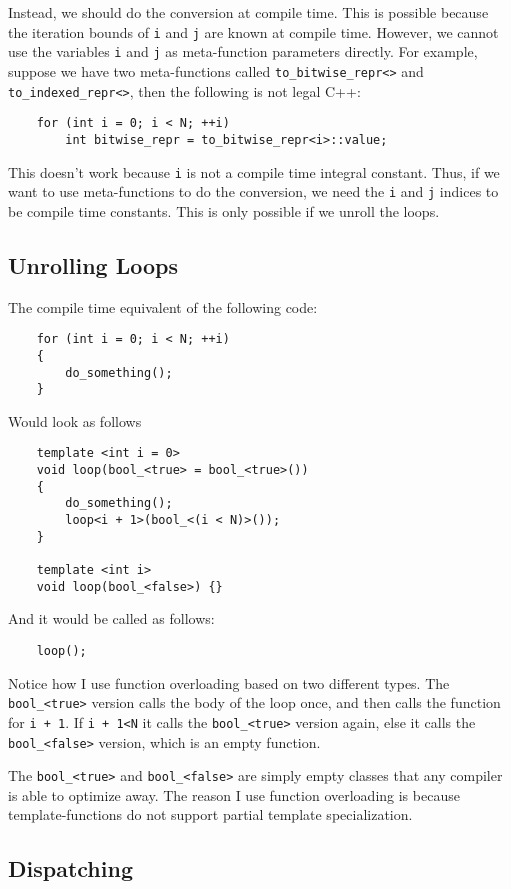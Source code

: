 \documentclass[10pt]{article}
\begin{document}
Instead, we should do the conversion at compile time. This is
possible because the iteration bounds of \verb"i" and \verb"j" are
known at compile time. However, we cannot use the variables
\verb"i" and \verb"j" as meta-function parameters directly. For
example, suppose we have two meta-functions called
\verb"to_bitwise_repr<>" and \verb"to_indexed_repr<>", then the
following is not legal C++:
\begin{verbatim}
    for (int i = 0; i < N; ++i)
        int bitwise_repr = to_bitwise_repr<i>::value;
\end{verbatim}
This doesn't work because \verb"i" is not a compile time integral
constant. Thus, if we want to use meta-functions to do the
conversion, we need the \verb"i" and \verb"j" indices to be
compile time constants. This is only possible if we unroll the
loops.

\subsection{Unrolling Loops}

The compile time equivalent of the following code:
\begin{verbatim}
    for (int i = 0; i < N; ++i)
    {
        do_something();
    }
\end{verbatim}
Would look as follows
\begin{verbatim}
    template <int i = 0>
    void loop(bool_<true> = bool_<true>())
    {
        do_something();
        loop<i + 1>(bool_<(i < N)>());
    }

    template <int i>
    void loop(bool_<false>) {}
\end{verbatim}
And it would be called as follows:
\begin{verbatim}
    loop();
\end{verbatim}
Notice how I use function overloading based on two different
types. The \verb"bool_<true>" version calls the body of the loop
once, and then calls the function for \verb"i + 1". If \verb"i + 1<N" it calls the \verb"bool_<true>" version again, else it
calls the \verb"bool_<false>" version, which is an empty
function.

The \verb"bool_<true>" and \verb"bool_<false>" are simply
empty classes that any compiler is able to optimize away. The
reason I use function overloading is because template-functions do
not support partial template specialization.

\subsection{Dispatching}
\end{document}
